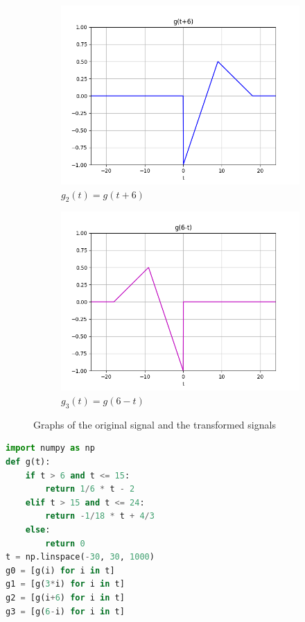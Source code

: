 \documentclass{article}
\begin{document}
\begin{figure}[ht!]
\begin{subfigure}{0.3\textwidth}
        \includegraphics[width=\textwidth]{p1_3.png}
        \caption{$g_2(t) = g(t+6)$}
    \end{subfigure}
    \begin{subfigure}{0.3\textwidth}
        \centering
        \includegraphics[width=\textwidth]{p1_4.png}
        \caption{$g_3(t) = g(6-t)$}
    \end{subfigure}
    \caption{Graphs of the original signal and the transformed signals}
    \label{fig:p1}
\end{figure}

\begin{lstlisting}[language=Python, caption={Python code to generate the signals}, label={code:p3}]
import numpy as np
def g(t):
    if t > 6 and t <= 15:
        return 1/6 * t - 2
    elif t > 15 and t <= 24:
        return -1/18 * t + 4/3
    else:
        return 0
t = np.linspace(-30, 30, 1000)
g0 = [g(i) for i in t]
g1 = [g(3*i) for i in t]
g2 = [g(i+6) for i in t]
g3 = [g(6-i) for i in t]
\end{lstlisting}
\end{document}

